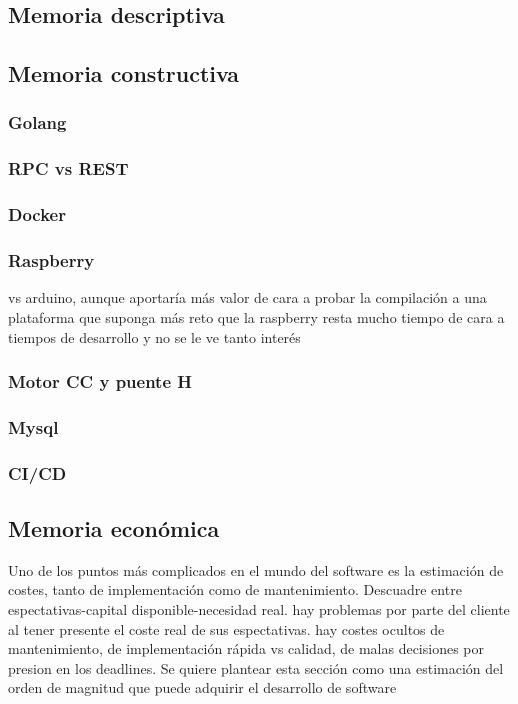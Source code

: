 \subsection{Memoria descriptiva}\label{subsec:memoria-descriptiva}

\subsection{Memoria constructiva}\label{subsec:memoria-constructiva}
\subsubsection{Golang}
		
	\subsubsection{RPC vs REST}
		
	\subsubsection{Docker}
		
	\subsubsection{Raspberry}
		vs arduino, aunque aportaría más valor de cara a probar la compilación a una plataforma que suponga más reto que la raspberry resta mucho tiempo de cara a tiempos de desarrollo y no se le ve tanto interés
	\subsubsection{Motor CC y puente H}
	\subsubsection{Mysql}
	\subsubsection{CI/CD}
\subsection{Memoria económica}\label{subsec:memoria-economica}
Uno de los puntos más complicados en el mundo del software es la estimación de costes, tanto de implementación como de mantenimiento. Descuadre entre espectativas-capital disponible-necesidad real. hay problemas por parte del cliente al tener presente el coste real de sus espectativas. hay costes ocultos de mantenimiento, de implementación rápida vs calidad, de malas decisiones por presion en los deadlines. Se quiere plantear esta sección como una estimación del orden de magnitud que puede adquirir el desarrollo de software